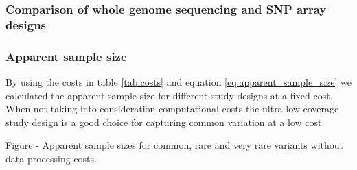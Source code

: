 



\subsubsection{Comparison of whole genome sequencing and SNP array designs}






\subsubsection{Apparent sample size}
By using the costs in table \ref{tab:costs} and equation \ref{eq:apparent_sample_size} we calculated the apparent sample size for different study designs at a fixed cost. When not taking into consideration computational costs the ultra low coverage study design is a good choice for capturing common variation at a low cost.

Figure - Apparent sample sizes for common, rare and very rare variants without data processing costs. 


